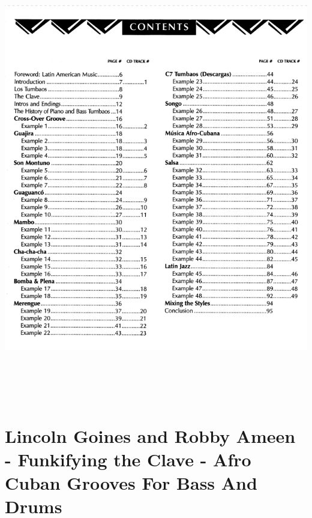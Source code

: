 \documentclass[a4paper]{book}
\begin{document}
\begin{center}
\includegraphics[width=17cm,height=19.394cm]{lebluessupportsmethodes-img166.png}
\end{center}
\clearpage\section{Lincoln Goines and Robby Ameen - Funkifying the
Clave - Afro Cuban Grooves For Bass And Drums}
\end{document}

